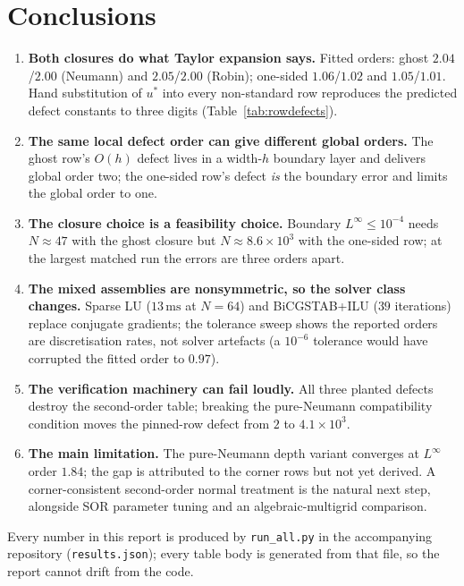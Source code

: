\documentclass[11pt,a4paper]{article}
\begin{document}
\section{Conclusions}
\label{sec:conclusions}

\begin{enumerate}
\item \textbf{Both closures do what Taylor expansion says.} Fitted orders:
      ghost $2.04$/$2.00$ (Neumann) and $2.05$/$2.00$ (Robin); one-sided
      $1.06$/$1.02$ and $1.05$/$1.01$. Hand substitution of $u^*$ into every
      non-standard row reproduces the predicted defect constants to three
      digits (Table~\ref{tab:rowdefects}).
\item \textbf{The same local defect order can give different global
      orders.} The ghost row's $O(h)$ defect lives in a width-$h$ boundary
      layer and delivers global order two; the one-sided row's defect
      \emph{is} the boundary error and limits the global order to one.
\item \textbf{The closure choice is a feasibility choice.} Boundary
      $L^\infty \le 10^{-4}$ needs $N \approx 47$ with the ghost closure
      but $N \approx 8.6\times10^{3}$ with the one-sided row; at the largest
      matched run the errors are three orders apart.
\item \textbf{The mixed assemblies are nonsymmetric, so the solver class
      changes.} Sparse LU ($13\,\mathrm{ms}$ at $N=64$) and
      BiCGSTAB+ILU ($39$ iterations) replace conjugate gradients; the
      tolerance sweep shows the reported orders are discretisation rates,
      not solver artefacts (a $10^{-6}$ tolerance would have corrupted the
      fitted order to $0.97$).
\item \textbf{The verification machinery can fail loudly.} All three
      planted defects destroy the second-order table; breaking the
      pure-Neumann compatibility condition moves the pinned-row defect from
      $2$ to $4.1\times10^3$.
\item \textbf{The main limitation.} The pure-Neumann depth variant
      converges at $L^\infty$ order $1.84$; the gap is attributed to the
      corner rows but not yet derived. A corner-consistent second-order
      normal treatment is the natural next step, alongside SOR parameter
      tuning and an algebraic-multigrid comparison.
\end{enumerate}

Every number in this report is produced by \texttt{run\_all.py} in the
accompanying repository (\texttt{results.json}); every table body is
generated from that file, so the report cannot drift from the code.
\end{document}
